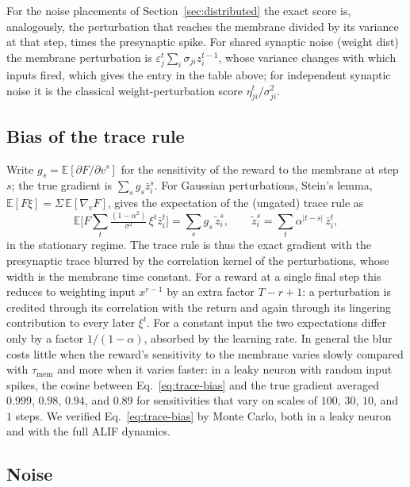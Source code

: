 \documentclass[10pt,twocolumn]{article}
\begin{document}
For the noise placements of Section~\ref{sec:distributed} the exact score is,
analogously, the perturbation that reaches the membrane divided by its
variance at that step, times the presynaptic spike. For shared synaptic noise
(weight dist) the membrane perturbation is
$\varepsilon^t_j\sum_i\sigma_{ji}z^{t-1}_i$, whose variance changes with which
inputs fired, which gives the entry in the table above; for independent
synaptic noise it is the classical weight-perturbation score
$\eta^t_{ji}/\sigma_{ji}^2$.

\subsection{Bias of the trace rule}
\label{app:trace-bias}

Write $g_s=\mathbb E[\partial F/\partial v^s]$ for the sensitivity of the
reward to the membrane at step $s$; the true gradient is
$\sum_s g_s\bar z^s_i$. For Gaussian perturbations, Stein's lemma,
$\mathbb E[F\xi]=\Sigma\,\mathbb E[\nabla_vF]$, gives the expectation of the
(ungated) trace rule as
\begin{equation}
\mathbb E\Big[F\sum_t\tfrac{(1-\alpha^2)}{\sigma^2}\,\xi^t\bar z^t_i\Big]
=\sum_s g_s\,\tilde z^s_i,\qquad
\tilde z^s_i=\sum_t\alpha^{|t-s|}\,\bar z^t_i ,
\label{eq:trace-bias}
\end{equation}
in the stationary regime. The trace rule is thus the exact gradient with the
presynaptic trace blurred by the correlation kernel of the perturbations,
whose width is the membrane time constant. For a reward at a single final step
this reduces to weighting input $x^{r-1}$ by an extra factor $T-r+1$: a
perturbation is credited through its correlation with the return and again
through its lingering contribution to every later $\xi^t$. For a constant input
the two expectations differ only by a factor $1/(1-\alpha)$, absorbed by the
learning rate. In general the blur costs little when the reward's sensitivity
to the membrane varies slowly compared with $\tau_{\mathrm{mem}}$ and more when
it varies faster: in a leaky neuron with random input spikes, the cosine between
Eq.~\eqref{eq:trace-bias} and the true gradient averaged $0.999$, $0.98$,
$0.94$, and $0.89$ for sensitivities that vary on scales of $100$, $30$, $10$,
and $1$ steps. We verified Eq.~\eqref{eq:trace-bias} by Monte Carlo, both in a
leaky neuron and with the full ALIF dynamics.

\subsection{Noise}
\label{app:trace-noise}
\end{document}
